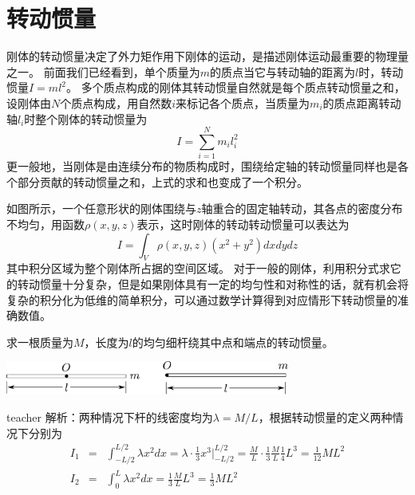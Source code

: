 \section{转动惯量}
刚体的转动惯量决定了外力矩作用下刚体的运动，是描述刚体运动最重要的物理量之一。
前面我们已经看到，单个质量为$m$的质点当它与转动轴的距离为$l$时，转动惯量$I=ml^2$。
多个质点构成的刚体其转动惯量自然就是每个质点转动惯量之和，设刚体由$N$个质点构成，用自然数$i$来标记各个质点，当质量为$m_i$的质点距离转动轴$l_i$时整个刚体的转动惯量为
\begin{equation}
I = \sum_{i=1}^N m_il_i^2
\end{equation}
更一般地，当刚体是由连续分布的物质构成时，围绕给定轴的转动惯量同样也是各个部分贡献的转动惯量之和，上式的求和也变成了一个积分。

如图所示，一个任意形状的刚体围绕与$z$轴重合的固定轴转动，其各点的密度分布不均匀，用函数$\rho(x,y,z)$表示，这时刚体的转动转动惯量可以表达为
\begin{equation}\label{eqn: rb-刚体转动惯量的一般形式}
I = \int_V \rho(x,y,z)(x^2+y^2)dxdydz
\end{equation}
其中积分区域为整个刚体所占据的空间区域。
对于一般的刚体，利用积分式求它的转动惯量十分复杂，但是如果刚体具有一定的均匀性和对称性的话，就有机会将复杂的积分化为低维的简单积分，可以通过数学计算得到对应情形下转动惯量的准确数值。

\begin{example}
求一根质量为$M$，长度为$l$的均匀细杆绕其中点和端点的转动惯量。
\begin{center}
\includegraphics[width=0.7\textwidth]{images/rb-2.pdf} 
\end{center}
\begin{taggedblock}{teacher}
\noindent
解析：两种情况下杆的线密度均为$\lambda = M/L$，根据转动惯量的定义两种情况下分别为
\begin{eqnarray*}
I_1 &= &\int_{-L/2}^{L/2}\lambda x^2dx = \lambda\cdot \frac{1}{3}x^3\bigg|_{-L/2}^{L/2} = \frac{M}{L}\cdot \frac{1}{3}\frac{M}{L}\frac{1}{4}L^3 = \frac{1}{12}ML^2\\
I_2 &=&  \int_{0}^{L}\lambda x^2dx = \frac{1}{3}\frac{M}{L}L^3 = \frac{1}{3}ML^2
\end{eqnarray*}
\end{taggedblock}
\end{example}

